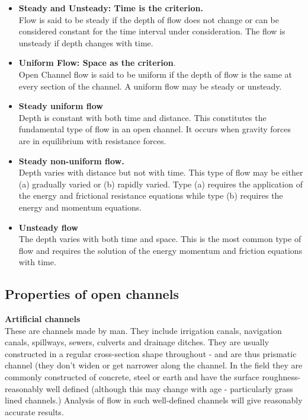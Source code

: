 \documentclass[a4paper, 12pt, british]{article} %
\numberwithin{equation}{section}
\numberwithin{figure}{section}
\numberwithin{table}{section}
\begin{document}
\begin{itemize}
	\item \textbf{Steady and Unsteady: Time is the criterion.}\\
Flow is said to be steady if the depth of flow does not change or can be considered constant for the time interval under consideration. The flow is unsteady if depth changes with time. 

\item \textbf{Uniform Flow: Space as the criterion}.\\
Open Channel flow is said to be uniform if the depth of flow is the same at every section of the channel. A uniform flow may be steady or unsteady.

\item\textbf{Steady uniform flow}\\
Depth is constant with both time and distance.
This constitutes the fundamental type of flow in an open channel. It occurs when gravity forces are in equilibrium with resistance forces.

\item \textbf{Steady non-uniform flow.}\\
Depth varies with distance but not with time. This type of flow may be either (a) gradually varied or (b) rapidly varied. Type (a) requires the application of the energy and frictional resistance equations while type (b) requires the energy and momentum equations.

\item \textbf{Unsteady flow}\\
The depth varies with both time and space. This is the most common type of flow and requires the solution of the energy momentum and friction equations with time.
\end{itemize}

\subsection{Properties  of open channels }

\textbf{Artificial channels}\\
These are channels made by man. They include irrigation canals, navigation canals, spillways, sewers, culverts and drainage ditches. They are usually constructed in a regular cross-section shape throughout - and are thus prismatic channel (they don't widen or get narrower along the channel. In the field they are commonly constructed of concrete, steel or earth and have the surface roughness- reasonably well defined (although this may change with age - particularly grass lined channels.) Analysis of flow in such well-defined channels will give reasonably accurate results.
\end{document}
